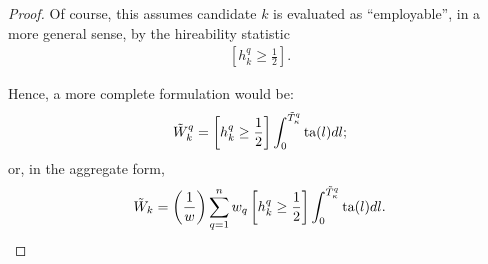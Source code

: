 \documentclass[hidelinks, nonatbib]{elsarticle}
\begin{document}
\begin{corollary}
\begin{proof}
        Of course, this assumes candidate $k$ is evaluated as ``employable'', in a more general sense, by the hireability statistic
        \begin{gather}
            \left[
                h_{k}^{q}
                \geq
                \frac{1}{2}
            \right]
            .
        \end{gather}
        
        Hence, a more complete formulation would be:
        \begin{gather}
            \tilde{W}_{k}^{q}
            =
            \left[
                h_{k}^{q}
                \geq
                \frac{1}{2}
            \right]
            \int_{0}^{\tilde{T}_{\kappa}^{q}}
            \text{ta}(l)
            dl
            ;
        \end{gather}
        or, in the aggregate form,
        \begin{gather}
            \tilde{W}_k 
            = 
            \left(
                \frac{1}{w}
            \right)
            \sum_{q=1}^{n}
            w_q
            \left[
                h_{k}^{q}
                \geq
                \frac{1}{2}
            \right]
            \int_{0}^{\tilde{T}_{\kappa}^{q}}
            \text{ta}(l)
            dl
            .
        \end{gather}
    \end{proof}        
\end{corollary}

\end{document}
